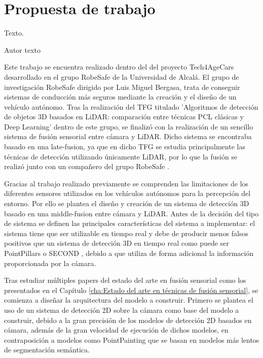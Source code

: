 \chapter{Propuesta de trabajo}
\label{cha:Propuesta de trabajo}

\begin{FraseCelebre}
  \begin{Frase}
    Texto.
  \end{Frase}
  \begin{Fuente}
    Autor texto
  \end{Fuente}
\end{FraseCelebre}

Este trabajo se encuentra realizado dentro del del proyecto Tech4AgeCars desarrollado en el grupo RobeSafe de la Universidad de Alcalá. El grupo de investigación RobeSafe dirigido por Luis Miguel Bergasa, trata de conseguir sistemas de conducción más seguros mediante la creación y el diseño de un vehículo autónomo. Tras la realización del \ac{TFG} titulado 'Algoritmos de detección de objetos 3D basados en LiDAR: comparación entre técnicas PCL clásicas y Deep Learning' \cite{tfg_javi} dentro de este grupo, se finalizó con la realización de un sencillo sistema de fusión sensorial entre cámara y \ac{LiDAR}. Dicho sistema se encontraba basado en una late-fusion, ya que en dicho \ac{TFG} se estudia principalmente las técnicas de detección utilizando únicamente \ac{LiDAR}, por lo que la fusión se realizó junto con un compañero del grupo RobeSafe \cite{tfg_miguel}.

Gracias al trabajo realizado previamente se comprenden las limitaciones de los diferentes sensores utilizados en los vehículos autónomos para la percepción del entorno. Por ello se plantea el diseño y creación de un sistema de detección 3D basado en una middle-fusion entre cámara y \ac{LiDAR}. Antes de la decisión del tipo de sistema se definen las principales características del sistema a implementar: el sistema tiene que ser utilizable en tiempo real y debe de producir menos falsos positivos que un sistema de detección 3D en tiempo real como puede ser PointPillars \cite{PointPillars} o SECOND \cite{SECOND}, debido a que utiliza de forma adicional la información proporcionada por la cámara.

Tras estudiar múltiples papers del estado del arte en fusión sensorial como los presentados en el Capítulo \ref{cha:Estado del arte en técnicas de fusión sensorial}, se comienza a diseñar la arquitectura del modelo a construir. Primero se plantea el uso de un sistema de detección 2D sobre la cámara como base del modelo a construir, debido a la gran precisión de los modelos de detección 2D basados en cámara, además de la gran velocidad de ejecución de dichos modelos, en contraposición a modelos como PointPainting \cite{PointPainting} que se basan en modelos más lentos de segmentación semántica.

